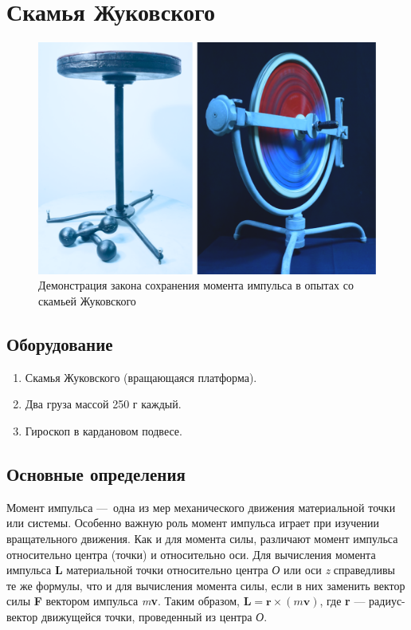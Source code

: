 \documentclass[All.tex]{subfiles}
\begin{document}
	

		\section{Скамья Жуковского}

		
\begin{figure}[H] 	
	\centering 	
	\includegraphics[width=0.9\linewidth]{chair-1.png}
	\caption{Демонстрация закона сохранения момента импульса в опытах со скамьей Жуковского}
	\label{chair-1}
\end{figure}
	
	\subsection*{\textcolor{PineGreen}{Оборудование}}

			\begin{enumerate} 
			\item Скамья Жуковского (вращающаяся платформа).
			\item Два груза массой 250 г каждый.
			\item Гироскоп в кардановом подвесе.
		\end{enumerate}

\subsection*{\textcolor{PineGreen}{Основные определения}}
	
	Момент импульса — одна из мер механического движения материальной точки или системы.
	Особенно важную роль момент импульса играет при изучении вращательного движения.
	Как и для момента силы, различают момент импульса относительно центра (точки) и относительно оси. 
	Для вычисления момента импульса \textbf{L} материальной точки относительно центра \textit{О} или оси \textit{z} справедливы те же формулы, что и для вычисления момента силы, если в них заменить вектор силы \textbf{F} вектором импульса \textit{m}\textbf{v}.
	Таким образом, $\textbf{L} = \textbf{r}\times (m\textbf{v})$, где \textbf{r} — радиус-вектор движущейся точки, проведенный из центра \textit{О}.
	
\end{document}
